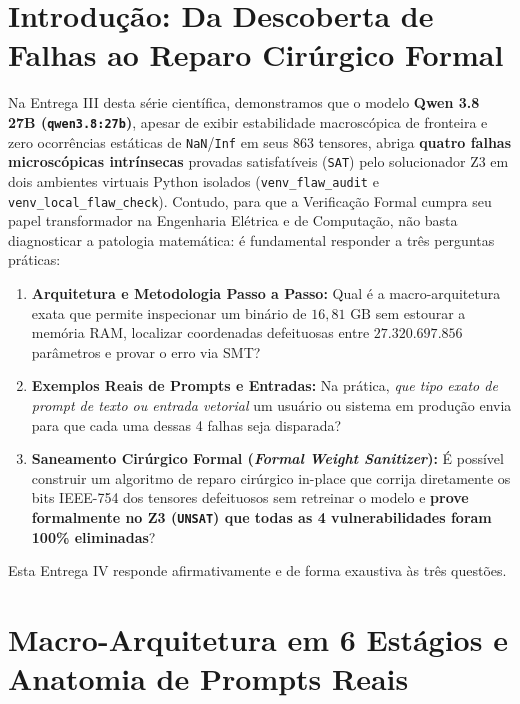 \documentclass[11pt,a4paper]{article}
\theoremstyle{definition}
\begin{document}
\section{Introdução: Da Descoberta de Falhas ao Reparo Cirúrgico Formal}

Na Entrega III desta série científica, demonstramos que o modelo \textbf{Qwen 3.8 27B (\texttt{qwen3.8:27b})}, apesar de exibir estabilidade macroscópica de fronteira e zero ocorrências estáticas de \texttt{NaN}/\texttt{Inf} em seus 863 tensores, abriga \textbf{quatro falhas microscópicas intrínsecas} provadas satisfatíveis (\texttt{SAT}) pelo solucionador Z3 em dois ambientes virtuais Python isolados (\texttt{venv\_flaw\_audit} e \texttt{venv\_local\_flaw\_check}). Contudo, para que a Verificação Formal cumpra seu papel transformador na Engenharia Elétrica e de Computação, não basta diagnosticar a patologia matemática: é fundamental responder a três perguntas práticas:

\begin{enumerate}
    \item \textbf{Arquitetura e Metodologia Passo a Passo:} Qual é a macro-arquitetura exata que permite inspecionar um binário de $16{,}81\text{ GB}$ sem estourar a memória RAM, localizar coordenadas defeituosas entre $27.320.697.856$ parâmetros e provar o erro via SMT?
    \item \textbf{Exemplos Reais de Prompts e Entradas:} Na prática, \textit{que tipo exato de prompt de texto ou entrada vetorial} um usuário ou sistema em produção envia para que cada uma dessas 4 falhas seja disparada?
    \item \textbf{Saneamento Cirúrgico Formal (\textit{Formal Weight Sanitizer}):} É possível construir um algoritmo de reparo cirúrgico in-place que corrija diretamente os bits IEEE-754 dos tensores defeituosos sem retreinar o modelo e \textbf{prove formalmente no Z3 (\texttt{UNSAT}) que todas as 4 vulnerabilidades foram 100\% eliminadas}?
\end{enumerate}

Esta Entrega IV responde afirmativamente e de forma exaustiva às três questões.

\section{Macro-Arquitetura em 6 Estágios e Anatomia de Prompts Reais}
\end{document}
